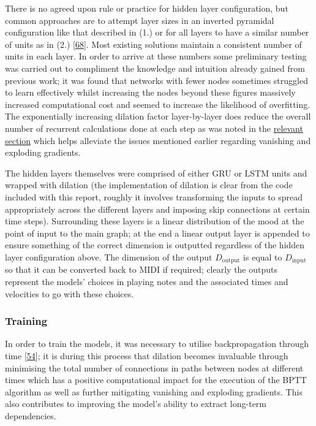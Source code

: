 \documentclass[12pt,]{article}
\begin{document}
There is no agreed upon rule or practice for hidden layer configuration,
but common approaches are to attempt layer sizes in an inverted
pyramidal configuration like that described in (1.) or for all layers to
have a similar number of units as in (2.)
{[}\protect\hyperlink{ref-doi10108001431160802549278}{68}{]}. Most
existing solutions maintain a consistent number of units in each layer.
In order to arrive at these numbers some preliminary testing was carried
out to compliment the knowledge and intuition already gained from
previous work; it was found that networks with fewer nodes sometimes
struggled to learn effectively whilst increasing the nodes beyond these
figures massively increased computational cost and seemed to increase
the likelihood of overfitting. The exponentially increasing dilation
factor layer-by-layer does reduce the overall number of recurrent
calculations done at each step as was noted in the
\protect\hyperlink{dilation}{relevant section} which helps alleviate the
issues mentioned earlier regarding vanishing and exploding gradients.

The hidden layers themselves were comprised of either GRU or LSTM units
and wrapped with dilation (the implementation of dilation is clear from
the code included with this report, roughly it involves transforming the
inputs to spread appropriately across the different layers and imposing
skip connections at certain time steps). Surrounding these layers is a
linear distribution of the mood at the point of input to the main graph;
at the end a linear output layer is appended to ensure something of the
correct dimension is outputted regardless of the hidden layer
configuration above. The dimension of the output \(D_{\text{output}}\)
is equal to \(D_{\text{input}}\) so that it can be converted back to
MIDI if required; clearly the outputs represent the models' choices in
playing notes and the associated times and velocities to go with these
choices.

\hypertarget{training}{%
\subsubsection{Training}\label{training}}

In order to train the models, it was necessary to utilise
backpropagation through time
{[}\protect\hyperlink{ref-werbos1990backpropagation}{54}{]}; it is
during this process that dilation becomes invaluable through minimising
the total number of connections in paths between nodes at different
times which has a positive computational impact for the execution of the
BPTT algorithm as well as further mitigating vanishing and exploding
gradients. This also contributes to improving the model's ability to
extract long-term dependencies.
\end{document}
